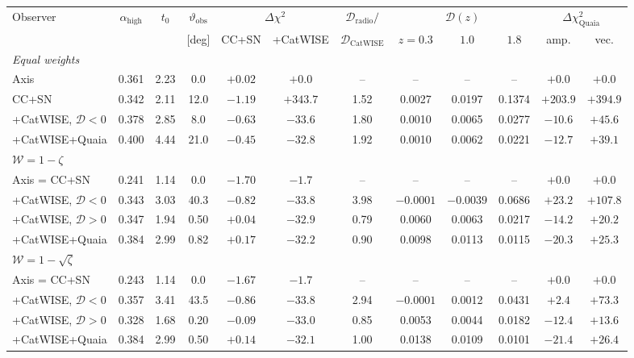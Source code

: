 \begin{tabular}{lccccccccccc}
\hline
Observer & $\alpha_{\mathrm{high}}$ & $t_0$ & $\vartheta_{\mathrm{obs}}$ & \multicolumn{2}{c}{$\Delta\chi^2$} & $\mathcal{D}_{\mathrm{radio}}/$ & \multicolumn{3}{c}{$\mathcal{D}(z)$} & \multicolumn{2}{c}{$\Delta\chi^2_{\mathrm{Quaia}}$} \\
 & & & [deg] & CC+SN & +CatWISE & $\mathcal{D}_{\mathrm{CatWISE}}$ & $z=0.3$ & $1.0$ & $1.8$ & amp. & vec. \\
\hline
\multicolumn{12}{l}{\textit{Equal weights}} \\
Axis & 0.361 & 2.23 & 0.0 & $+0.02$ & $+0.0$ & -- & -- & -- & -- & $+0.0$ & $+0.0$ \\
CC+SN & 0.342 & 2.11 & 12.0 & $-1.19$ & $+343.7$ & 1.52 & 0.0027 & 0.0197 & 0.1374 & $+203.9$ & $+394.9$ \\
+CatWISE, $\mathcal{D}<0$ & 0.378 & 2.85 & 8.0 & $-0.63$ & $-33.6$ & 1.80 & 0.0010 & 0.0065 & 0.0277 & $-10.6$ & $+45.6$ \\
+CatWISE+Quaia & 0.400 & 4.44 & 21.0 & $-0.45$ & $-32.8$ & 1.92 & 0.0010 & 0.0062 & 0.0221 & $-12.7$ & $+39.1$ \\
\multicolumn{12}{l}{\textit{$\mathcal{W}=1-\zeta$}} \\
Axis = CC+SN & 0.241 & 1.14 & 0.0 & $-1.70$ & $-1.7$ & -- & -- & -- & -- & $+0.0$ & $+0.0$ \\
+CatWISE, $\mathcal{D}<0$ & 0.343 & 3.03 & 40.3 & $-0.82$ & $-33.8$ & 3.98 & $-0.0001$ & $-0.0039$ & 0.0686 & $+23.2$ & $+107.8$ \\
+CatWISE, $\mathcal{D}>0$ & 0.347 & 1.94 & 0.50 & $+0.04$ & $-32.9$ & 0.79 & 0.0060 & 0.0063 & 0.0217 & $-14.2$ & $+20.2$ \\
+CatWISE+Quaia & 0.384 & 2.99 & 0.82 & $+0.17$ & $-32.2$ & 0.90 & 0.0098 & 0.0113 & 0.0115 & $-20.3$ & $+25.3$ \\
\multicolumn{12}{l}{\textit{$\mathcal{W}=1-\sqrt{\zeta}$}} \\
Axis = CC+SN & 0.243 & 1.14 & 0.0 & $-1.67$ & $-1.7$ & -- & -- & -- & -- & $+0.0$ & $+0.0$ \\
+CatWISE, $\mathcal{D}<0$ & 0.357 & 3.41 & 43.5 & $-0.86$ & $-33.8$ & 2.94 & $-0.0001$ & 0.0012 & 0.0431 & $+2.4$ & $+73.3$ \\
+CatWISE, $\mathcal{D}>0$ & 0.328 & 1.68 & 0.20 & $-0.09$ & $-33.0$ & 0.85 & 0.0053 & 0.0044 & 0.0182 & $-12.4$ & $+13.6$ \\
+CatWISE+Quaia & 0.384 & 2.99 & 0.50 & $+0.14$ & $-32.1$ & 1.00 & 0.0138 & 0.0109 & 0.0101 & $-21.4$ & $+26.4$ \\
\hline
\end{tabular}
